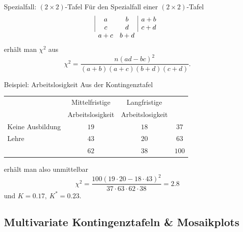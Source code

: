 \documentclass[
  10pt,
  ignorenonframetext,
]{beamer}
\begin{document}
\begin{frame}{Spezialfall: \((2 \times 2)\)-Tafel}
\label{spezialfall-2-times-2-tafel}
Für den Spezialfall einer \((2 \times 2)\)-Tafel \begin{displaymath}
\begin{array}{|cc|c}\cline{1-2}
a & b & a+b\\
c & d & c+d\\ \cline{1-2}
\multicolumn{1}{c}{a+c}
  & \multicolumn{1}{c}{b+d}
\end{array}
\end{displaymath} erhält man \(\chi^2\) aus \begin{displaymath}
\chi^2 = \frac{n(ad-bc)^2}{(a+b)(a+c)(b+d)(c+d)}.
\end{displaymath}
\end{frame}

\begin{frame}{Beispiel: Arbeitslosigkeit}
\label{beispiel-arbeitslosigkeit-2}
Aus der Kontingenztafel

\begin{center}\small
\begin{tabular}{l|cc|c}
\multicolumn{1}{c}{}
& \multicolumn{1}{c}{Mittelfristige}
  & \multicolumn{1}{c}{Langfristige}\\
\multicolumn{1}{c}{}
& \multicolumn{1}{c}{Arbeitslosigkeit}
  & \multicolumn{1}{c}{Arbeitslosigkeit}\\\cline{2-3}
Keine Ausbildung  & $19$ & $18$ & $37$ \\
Lehre             & $43$ & $20$ & $63$ \\\cline{2-3}
\multicolumn{1}{c}{}
& \multicolumn{1}{c}{$62$}
  & \multicolumn{1}{c}{$38$} & $100$
\end{tabular}
\end{center}

erhält man also unmittelbar \begin{displaymath}
\chi^2 = \frac{100(19\cdot 20-18\cdot 43)^2}{37\cdot 63\cdot 62 \cdot38} = 2.8
\end{displaymath} und \(K = 0.17,\ K^* = 0.23\).
\end{frame}

\subsection{Multivariate Kontingenztafeln \&
Mosaikplots}\label{multivariate-kontingenztafeln-mosaikplots}
\end{document}
